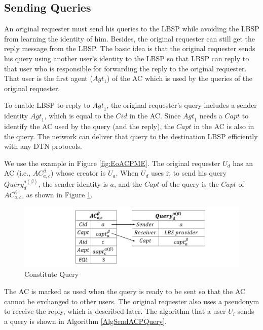 \subsection{ Sending Queries}

\noindent An original requester must send his queries to the LBSP while avoiding the LBSP from learning the identity of him. Besides, the original requester can still get the reply message from the LBSP. The basic idea is that the original requester sends his query using another user's identity to the LBSP so that LBSP can reply to that user who is responsible for forwarding the reply to the original requester. That user is the first agent ($Agt_1$) of the AC which is used by the queries of the original requester.

To enable LBSP to reply to ${Agt}_1$, the original requester's query includes a sender identity ${Agt}_1$, which is equal to the $Cid$ in the AC. Since ${Agt}_1$ needs a ${Capt}$ to identify the AC used by the query (and the reply), the ${Capt}$ in the AC is also in the query. The network can deliver that query to the destination LBSP efficiently with any DTN protocols.

We use the example in Figure \ref{fig:EoACPME}. The original requester $U_d$ has an AC (i.e., ${AC}^{\beta }_{a,c}$) whose creator is $U_a$. When $U_d$ uses it to send his query ${Query}^{a\left(\beta\right)}_d$, the sender identity is $a$, and the $Capt$ of the query is the $Capt$ of ${AC}^{\beta }_{a,c}$, as shown in Figure \ref{fig:ConstituteQuery}.

\begin{figure} [H]
  \centering 
  \includegraphics[width=6.0in]{figures/FIG_4_5_Constitute_Query.png}
  \caption{Constitute Query} 
  \label{fig:ConstituteQuery} %
\end{figure}

The AC is marked as used when the query is ready to be sent so that the AC cannot be exchanged to other users. The original requester also uses a pseudonym to receive the reply, which is described later. The algorithm that a user $U_i$ sends a query is shown in Algorithm \ref{AlgSendACPQuery}.


